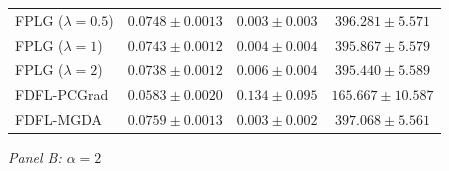 \begin{table}[htbp]
\begin{tabular}{l ccc}
FPLG ($\lambda\!=\!0.5$)                     & $0.0748 \pm 0.0013$ & $0.003 \pm 0.003$ & $396.281 \pm 5.571$ \\
FPLG ($\lambda\!=\!1$)                       & $0.0743 \pm 0.0012$ & $0.004 \pm 0.004$ & $395.867 \pm 5.579$ \\
FPLG ($\lambda\!=\!2$)                       & $0.0738 \pm 0.0012$ & $0.006 \pm 0.004$ & $395.440 \pm 5.589$ \\
\midrule
FDFL-PCGrad                                  & $0.0583 \pm 0.0020$ & $0.134 \pm 0.095$ & $165.667 \pm 10.587$ \\
FDFL-MGDA                                    & $0.0759 \pm 0.0013$ & $0.003 \pm 0.002$ & $397.068 \pm 5.561$ \\
\bottomrule
\end{tabular}

\bigskip
\textit{Panel B: $\alpha = 2$}


\end{table}

